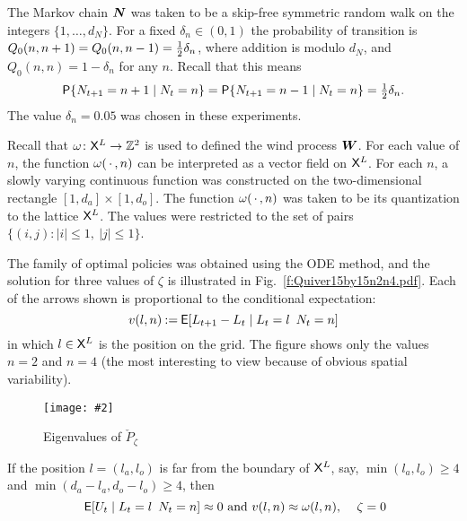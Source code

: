 \documentclass[final,12pt]{colt2018} %
\newcommand{\field}[1]{\mathbb{#1}}
\def\ZZ{\field{Z}}
\def\cP{{\check{P}}}
\def\bfmath#1{{\mathchoice{\mbox{\boldmath$#1$}}%
{\mbox{\boldmath$#1$}}%
{\mbox{\boldmath$\scriptstyle#1$}}%
{\mbox{\boldmath$\scriptscriptstyle#1$}}}}
\def\bfmN{\bfmath{N}}
\def\bfmW{\bfmath{W}}
\def\FRAC#1#2#3{\genfrac{}{}{}{#1}{#2}{#3}}
\def\half{{\mathchoice{\FRAC{1}{1}{2}}%
{\FRAC{1}{1}{2}}%
{\FRAC{3}{1}{2}}%
{\FRAC{3}{1}{2}}}}
\def\eqdef{\mathbin{:=}}
\def\Prob{{\sf P}}
\def\Expect{{\sf E}}
\def\varble{\,\cdot\,}
\def\Ebox#1#2{%
\begin{center}
\texttt{[image: \#2]} \end{center}}
\def\Fig#1{Fig.~\ref{#1}}
\begin{document}
The Markov chain $\bfmN$ was taken to be a skip-free symmetric random walk on the integers $\{ 1,\dots,d_N\}$.   For a fixed $\delta_n\in(0,1)$ the probability of transition is $Q_0(n,n+ 1) =Q_0(n,n-1) =\half \delta_n $,
where addition is modulo $d_N$,  
and $Q_0(n,n) =1-\delta_n$ for any $n$.
Recall that this means
\[ 
\Prob\{N_{t+1} = n+1 \mid N_t = n\}
=
\Prob\{N_{t+1} = n-1 \mid N_t = n\} =  \half \delta_n. 
\]
The value $\delta_n=0.05$ was chosen in these experiments.



Recall that $\wind\colon \stateL\to \ZZ^2$ is used to defined the wind process $\bfmW$.  
For each value of $n$,  the function $\wind(\varble,n)$ can be interpreted as a vector field on $\stateL$.   For each $n$,  a slowly varying continuous function was constructed on the two-dimensional rectangle $[1,d_a]\times[1,d_o]$. The function $\wind(\varble,n)$ was  taken to be its quantization to the lattice $\stateL$.
 The values were restricted to the set of pairs $\{(i,j): |i|\le 1,\ |j|\le 1\}$.  

 

The family of optimal policies was obtained using the ODE method,   and the solution for three values of $\zeta $ is illustrated in  \Fig{f:Quiver15by15n2n4.pdf}.    Each of the arrows shown is proportional to  the conditional expectation:
\begin{equation}
v(l,n) \eqdef 
\Expect[L_{t+1} - L_t \mid L_t = l\, \ N_t=n]
\label{e:velocity}
\end{equation}
in which $l\in\stateL$ is the position on the grid.  The figure shows only the values $n=2$ and $n=4$ (the most interesting to view because of obvious spatial variability). 


\begin{wrapfigure}{l}{.35\hsize}
\vspace{-2ex}
\Ebox{.95}{EigenvalueComparison15x15small.pdf} 
\vspace{-4ex}
\caption{\small Eigenvalues of $\cP_\zeta$ }%
\label{f:EigenvalueComparison15x15}
\vspace{.25ex}
\end{wrapfigure} 
 
If the position $l=(l_a,l_o)$  is far from the boundary of $\stateL$, say,  $\min(l_a,l_o)\ge 4$ and  $\min(d_a-l_a,d_o-l_o)\ge 4$, then
\[
\text{  $\Expect[U_t \mid L_t = l\, \ N_t=n]\approx 0$ and 
$
v(l,n) \approx \wind(l,n)$,  \quad $\zeta=0$}
\]
\end{document}
